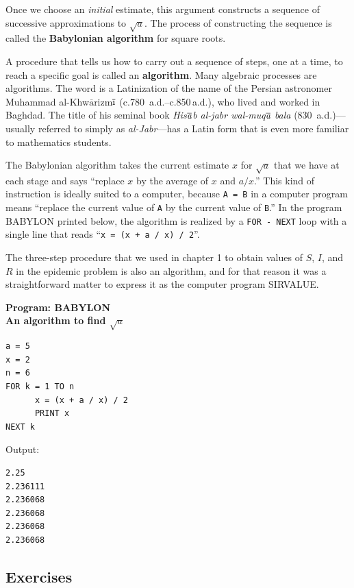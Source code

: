 Once we choose an {\em initial\/} estimate, this argument constructs a sequence of successive approximations to $\sqrt{a}$.  The process of constructing the sequence is called the {\bf Babylonian algorithm}
 for square roots.  

A procedure that tells us how to carry out a sequence of steps, one at
a time, to reach a specific goal is called an {\bf
  algorithm}. Many algebraic processes are
algorithms. The word is a Latinization of the name of the Persian
astronomer Muhammad
al-Khw$\overline{\mbox{a}}$rizm$\overline{\mbox{\i}}$ (c.780\,{\sc
  a.d.}--c.850\,{\sc a.d.}), who lived and worked in Baghdad.  The title
of his seminal book {\em His}$\overline{\mbox{{\em a}}}${\em b al-jabr
  wal-muq}$\overline{\mbox{{\em a}}}$ {\em bala\/} (830\,{\sc
  a.d.})---usually referred to simply as {\em al-Jabr}---has a Latin
form that is even more familiar to mathematics students.

The Babylonian algorithm takes the current estimate $x$ for $\sqrt{a}$
 that we have at each stage and says ``replace $x$ by the average of
 $x$ and $a/x$.''  This kind of instruction is ideally suited to a
 computer, because {\tt A = B} in a computer program means ``replace
 the current value of {\tt A} by the current value of {\tt B}.''  In
 the program BABYLON printed below, the algorithm is realized by a
 {\tt FOR - NEXT} loop with a single line that reads ``{\tt x = (x + a
 / x) / 2}''.

The three-step procedure that we used in chapter 1 to obtain values of
 $S$, $I$, and $R$ in the epidemic problem is also an algorithm, and
 for that reason it was a straightforward matter to express it as the
 computer program SIRVALUE.
\begin{center}

{\bf Program: BABYLON \\
\bf An algorithm to find \boldmath $\sqrt{a}$}
\end{center}

\begin{verbatim}
a = 5
x = 2
n = 6
FOR k = 1 TO n
      x = (x + a / x) / 2
      PRINT x
NEXT k
\end{verbatim}

Output:

\begin{verbatim}
2.25
2.236111
2.236068
2.236068
2.236068
2.236068
\end{verbatim}

\subsection{Exercises}
\label{subsec:exercises}


